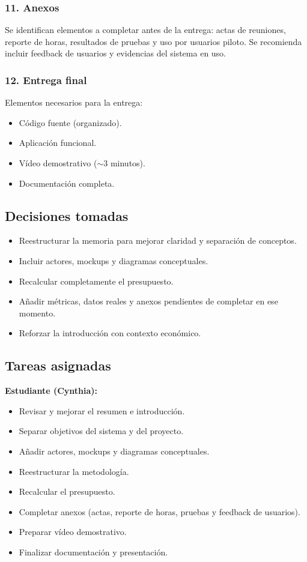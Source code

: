 \subsubsection*{11. Anexos}
Se identifican elementos a completar antes de la entrega: actas de reuniones, reporte de horas, resultados de pruebas y uso por usuarios piloto. Se recomienda incluir feedback de usuarios y evidencias del sistema en uso.

\subsubsection*{12. Entrega final}
Elementos necesarios para la entrega:
\begin{itemize}
    \item Código fuente (organizado).
    \item Aplicación funcional.
    \item Vídeo demostrativo ($\sim$3 minutos).
    \item Documentación completa.
\end{itemize}

\subsection*{Decisiones tomadas}
\begin{itemize}
    \item Reestructurar la memoria para mejorar claridad y separación de conceptos.
    \item Incluir actores, mockups y diagramas conceptuales.
    \item Recalcular completamente el presupuesto.
    \item Añadir métricas, datos reales y anexos pendientes de completar en ese momento.
    \item Reforzar la introducción con contexto económico.
\end{itemize}

\subsection*{Tareas asignadas}

\textbf{Estudiante (Cynthia):}
\begin{itemize}
    \item Revisar y mejorar el resumen e introducción.
    \item Separar objetivos del sistema y del proyecto.
    \item Añadir actores, mockups y diagramas conceptuales.
    \item Reestructurar la metodología.
    \item Recalcular el presupuesto.
    \item Completar anexos (actas, reporte de horas, pruebas y feedback de usuarios).
    \item Preparar vídeo demostrativo.
    \item Finalizar documentación y presentación.
\end{itemize}


